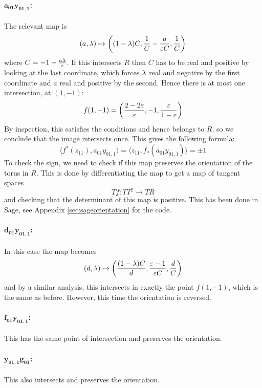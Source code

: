 \paragraph{$\mathbf{a_{01} y_{01,1}}$:}
The relevant map is
\[ (a,\lambda) \mapsto \left( (1-\lambda)C, \frac{1}{C}-\frac{a}{\varepsilon
    C},\frac{1}{C}\right)\]
where $C = -1-\frac{a\lambda}{\varepsilon}$. If this intersects $R$ then $C$ has
to be real and positive by looking at the last coordinate, which
forces $\lambda$ real and negative by the first coordinate and $a$ real and
positive by the second. Hence there is at most one intersection, at
$(1,-1)$:
\[ f(1,-1) = \left( \frac{2-2\varepsilon}{\varepsilon},-1,\frac{\varepsilon}{1-\varepsilon}\right) \]
By inspection, this satisfies the conditions and hence belongs to
$R$, so we conclude that the image intersects once. This gives the
following formula:
\[ \langle f^*(z_{11}), a_{01}y_{01,1} \rangle = \langle
z_{11},f_*(a_{01}y_{01,1})\rangle = \pm 1 \]
To check the sign, we need to check if this map preserves the
orientation of the torus in $R$. This is done by differentiating the
map to get a map of tangent spaces
\[ Tf : TT^2 \to TR \]
and checking that the determinant of this map is
positive. This has been done in Sage, see Appendix
\ref{sec:sageorientation} for the code.

\paragraph{$\mathbf{d_{01} y_{01,1}}$:}
In this case the map becomes
\[ (d,\lambda) \mapsto \left( \frac{(1-\lambda)C}{d},\frac{\varepsilon-1}{\varepsilon C},
  \frac{d}{C} \right) \]
and by a similar analysis, this intersects in exactly the
point $f(1,-1)$, which is the same as before. However, this time the
orientation is reversed.

\paragraph{$\mathbf{f_{01} y_{01,1}}$:}
This has the same point of intersection and preserves the orientation.

\paragraph{$\mathbf{y_{01,1}g_{01}}$:}
This also intersects and preserves the orientation.


